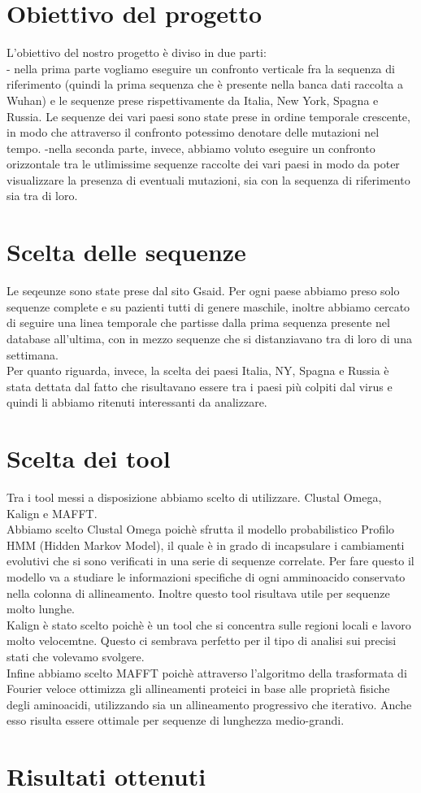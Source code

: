 \documentclass[a4paper,10pt]{article}
\begin{document}
\section*{Obiettivo del progetto}
L'obiettivo del nostro progetto è diviso in due parti: \\
	- nella prima parte vogliamo eseguire un confronto verticale fra la sequenza di riferimento (quindi la prima sequenza che è presente nella banca dati raccolta a Wuhan) e le sequenze prese rispettivamente da Italia, New York, Spagna e Russia. Le sequenze dei vari paesi sono state prese in ordine temporale crescente, in modo che attraverso il confronto potessimo denotare delle mutazioni nel tempo.
	-nella seconda parte, invece, abbiamo voluto eseguire un confronto orizzontale tra le utlimissime sequenze raccolte dei vari paesi in modo da poter visualizzare la presenza di eventuali mutazioni, sia con la sequenza di riferimento sia tra di loro. 

\section*{Scelta delle sequenze}
Le seqeunze sono state prese dal sito Gsaid. Per ogni paese abbiamo preso solo sequenze complete e su pazienti tutti di genere maschile, inoltre abbiamo cercato di seguire una linea temporale che partisse dalla prima sequenza presente nel database all'ultima, con in mezzo sequenze che si distanziavano tra di loro di una settimana. \\
Per quanto riguarda, invece, la scelta dei paesi Italia, NY, Spagna e Russia è stata dettata dal fatto che risultavano essere tra i paesi più colpiti dal virus e quindi li abbiamo ritenuti interessanti da analizzare.\\

\section*{Scelta dei tool}
Tra i tool messi a disposizione abbiamo scelto di utilizzare. Clustal Omega, Kalign e MAFFT.\\
Abbiamo scelto Clustal Omega poichè sfrutta il modello probabilistico Profilo HMM (Hidden Markov Model), il quale è in grado di incapsulare i cambiamenti evolutivi che si sono verificati in una serie di sequenze correlate. Per fare questo il modello va a studiare le informazioni specifiche di ogni amminoacido conservato nella colonna di allineamento. Inoltre questo tool risultava utile per sequenze molto lunghe.\\
Kalign è stato scelto poichè è un tool che si concentra sulle regioni locali e lavoro molto velocemtne. Questo ci sembrava perfetto per il tipo di analisi sui precisi stati che volevamo svolgere.\\
Infine abbiamo scelto MAFFT poichè attraverso l'algoritmo della trasformata di Fourier veloce ottimizza gli allineamenti proteici in base alle proprietà fisiche degli aminoacidi, utilizzando sia un allineamento progressivo che iterativo. Anche esso risulta essere ottimale per sequenze di lunghezza medio-grandi.

\section*{Risultati ottenuti}

\end{document}
